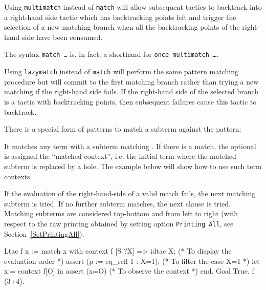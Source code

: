 \begin{Variants}

\item {}
Using {\tt multimatch} instead of {\tt match} will allow subsequent
tactics to backtrack into a right-hand side tactic which has
backtracking points left and trigger the selection of a new matching
branch when all the backtracking points of the right-hand side have
been consumed.

The syntax {\tt match \ldots} is, in fact, a shorthand for
{\tt once multimatch \ldots}.

\item {}
Using {\tt lazymatch} instead of {\tt match} will perform the same
pattern matching procedure but will commit to the first matching
branch rather than trying a new matching if the right-hand side
fails. If the right-hand side of the selected branch is a tactic with
backtracking points, then subsequent failures cause this tactic to
backtrack.

\item {}
There is a special form of patterns to match a subterm against the
pattern:
\begin{quote}
{}
\end{quote}
It matches any term with a subterm matching {\cpattern}. If there is
a match, the optional {\ident} is assigned the ``matched context'', i.e.
the initial term where the matched subterm is replaced by a
hole. The example below will show how to use such term contexts.

If the evaluation of the right-hand-side of a valid match fails, the
next matching subterm is tried. If no further subterm matches, the
next clause is tried. Matching subterms are considered top-bottom and
from left to right (with respect to the raw printing obtained by
setting option {\tt Printing All}, see Section~\ref{SetPrintingAll}).

\begin{coq_example}
Ltac f x :=
  match x with
    context f [S ?X] => 
    idtac X;                    (* To display the evaluation order *)
    assert (p := eq_refl 1 : X=1);    (* To filter the case X=1 *)
    let x:= context f[O] in assert (x=O) (* To observe the context *)
  end.
Goal True.
f (3+4).
\end{coq_example}


\end{Variants}
